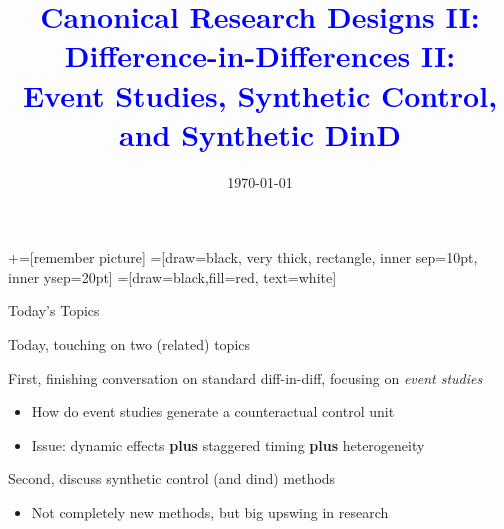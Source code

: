 \documentclass[notes,11pt, aspectratio=169]{beamer}
\title[]{\textcolor{blue}{Canonical Research Designs II:\\ Difference-in-Differences II:\\
  Event Studies, Synthetic Control, and Synthetic DinD}}
\author[PGP]{}
\institute[FRBNY]{\small{\begin{tabular}{c}
  Paul Goldsmith-Pinkham  \\
\end{tabular}}}
\date{\today}
\newenvironment{wideitemize}{\itemize\addtolength{\itemsep}{10pt}}{\enditemize}
\begin{document}
\newcommand\marktopleft[1]{%
    \tikz[overlay,remember picture] 
        \node (marker-#1-a) at (-.3em,.3em) {};%
}
\newcommand\markbottomright[2]{%
    \tikz[overlay,remember picture] 
        \node (marker-#1-b) at (0em,0em) {};%
}
+=[remember picture] 
 =[draw=black, very thick, rectangle, inner sep=10pt, inner ysep=20pt]
 =[draw=black,fill=red, text=white]

\begin{frame}
\maketitle
\end{frame}

\begin{frame}{Today's Topics}
  \begin{wideitemize}
  \item Today, touching on two (related) topics
  \item First, finishing conversation on standard diff-in-diff,
    focusing on \emph{event studies}
    \begin{itemize}
    \item How do event studies generate a counteractual control unit
    \item Issue: dynamic effects \textbf{plus} staggered timing \textbf{plus} heterogeneity
    \end{itemize}
  \item Second, discuss synthetic control (and dind) methods
    \begin{itemize}
    \item Not completely new methods, but big upswing in research
    \end{itemize}
  \end{wideitemize}
\end{frame}
\end{document}
